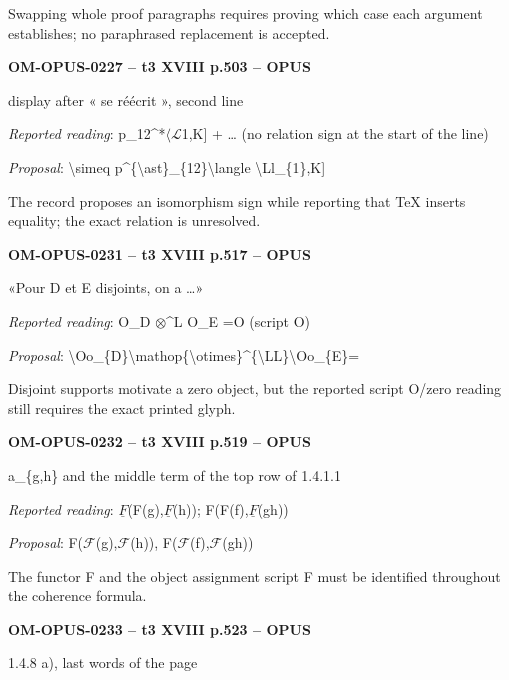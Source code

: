 Swapping whole proof paragraphs requires proving which case each argument establishes; no paraphrased replacement is accepted.\par
\par\noindent\textbf{OM-OPUS-0227 -- t3 XVIII p.503 -- OPUS}\par
display after « se réécrit », second line\par
\emph{Reported reading}: p\_12\textasciicircum{}*\ensuremath{\langle}\ensuremath{\mathcal{L}}1,K] + … (no relation sign at the start of the line)\par
\emph{Proposal}: \textbackslash{}simeq p\textasciicircum{}\{\textbackslash{}ast\}\_\{12\}\textbackslash{}langle \textbackslash{}Ll\_\{1\},K]\par
The record proposes an isomorphism sign while reporting that TeX inserts equality; the exact relation is unresolved.\par
\par\noindent\textbf{OM-OPUS-0231 -- t3 XVIII p.517 -- OPUS}\par
«Pour D et E disjoints, on a …»\par
\emph{Reported reading}: O\_D \ensuremath{\otimes}\textasciicircum{}L O\_E =\allowbreak  O (script O)\par
\emph{Proposal}: \textbackslash{}Oo\_\{D\}\textbackslash{}mathop\{\textbackslash{}otimes\}\textasciicircum{}\{\textbackslash{}LL\}\textbackslash{}Oo\_\{E\}=\par
Disjoint supports motivate a zero object, but the reported script O/zero reading still requires the exact printed glyph.\par
\par\noindent\textbf{OM-OPUS-0232 -- t3 XVIII p.519 -- OPUS}\par
a\_\{g,h\} and the middle term of the top row of 1.4.1.1\par
\emph{Reported reading}: \ensuremath{\underline{F}}(F(g),\ensuremath{\underline{F}}(h)); F(F(f),\ensuremath{\underline{F}}(gh))\par
\emph{Proposal}: F(\ensuremath{\mathcal{F}}(g),\ensuremath{\mathcal{F}}(h)), F(\ensuremath{\mathcal{F}}(f),\ensuremath{\mathcal{F}}(gh))\par
The functor F and the object assignment script F must be identified throughout the coherence formula.\par
\par\noindent\textbf{OM-OPUS-0233 -- t3 XVIII p.523 -- OPUS}\par
1.4.8 a), last words of the page\par
